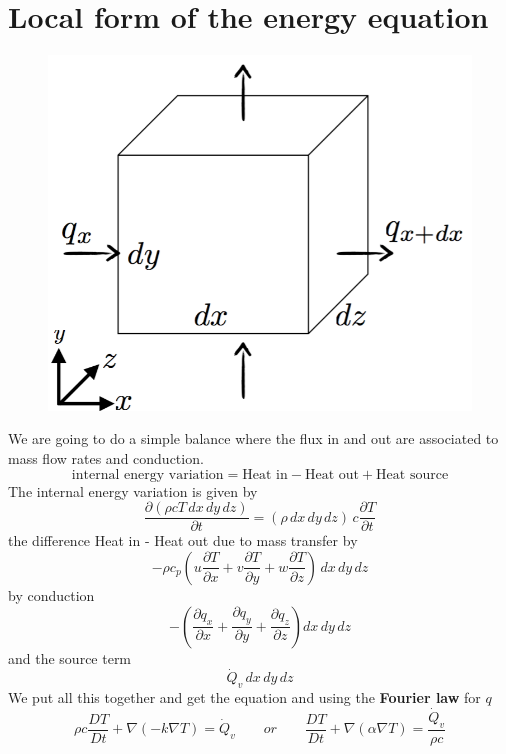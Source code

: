 \section{Local form of the energy equation}
	\begin{figure}
	\vspace{-5 mm}
	\includegraphics[scale=0.25]{ch5/5}
	\end{figure}			
	We are going to do a simple balance where the flux in and out are associated to mass flow rates and conduction. 
	\begin{equation}
		\mbox{internal energy variation} = \mbox{Heat in}-\mbox{Heat out}+\mbox{Heat source}
	\end{equation}
	The internal energy variation is given by
	\begin{equation}
		\frac{\partial (\rho cT\, dx\, dy\, dz)}{\partial t} = (\rho\, dx\, dy\, dz)\, c\frac{\partial T}{\partial t}
	\end{equation}
	the difference Heat in - Heat out due to mass transfer by 
	\begin{equation}
		- \rho c_p (u\frac{\partial T}{\partial x} +v\frac{\partial T}{\partial y} + w\frac{\partial T}{\partial z})\, dx\, dy\, dz
	\end{equation}
	by conduction
	\begin{equation}
		- \left( \frac{\partial q_x}{\partial x} + \frac{\partial q_y}{\partial y} + \frac{\partial q_z}{\partial z} \right) dx\, dy \, dz
	\end{equation}
	and the source term 
	\begin{equation}
		\dot{Q}_v \, dx \, dy \, dz
	\end{equation}
	We put all this together and get the equation and using the \textbf{Fourier law} for $q$
	\begin{equation}
	 \rho c\frac{DT}{Dt} + \nabla (-k\nabla T) = \dot{Q}_v \qquad or \qquad \frac{DT}{Dt} + \nabla (\alpha \nabla T) = \frac{\dot{Q}_v}{\rho c}
	 \label{eq:5.27}
	\end{equation}
	
